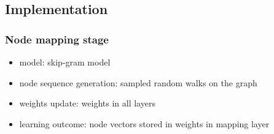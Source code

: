 \documentclass{article}
\begin{document}
\subsection{Implementation}

\subsubsection{Node mapping stage}
\begin{itemize}
	\item model: skip-gram model
	\item node sequence generation: sampled random walks on the graph
	\item weights update: weights in all layers
	\item learning outcome: node vectors stored in weights in mapping layer
\end{itemize}
\end{document}
